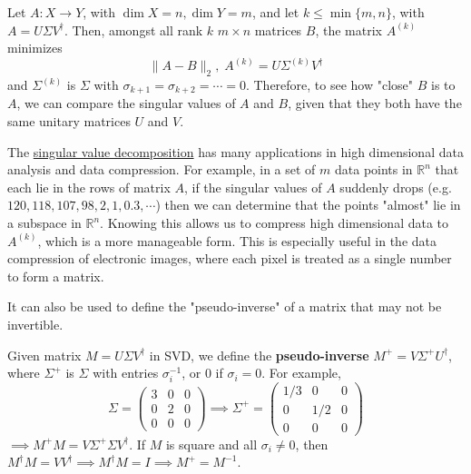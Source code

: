  \begin{theorem}
    \label{thm:eckart-young-low-rank-approximation}
    Let $A: X \to Y$, with $\dim{X} = n, \dim{Y} = m$, and let $k \leq \min{\{m, n\}}$, with $A = U \Sigma V^\dagger$. Then, amongst all rank $k$ $m \times n$ matrices $B$, the matrix $A^{(k)}$ minimizes 
    \begin{equation}
      \|A-B\|_2, \; A^{(k)} = U \Sigma^{(k)} V^\dagger
    \end{equation}
    and $\Sigma^{(k)}$ is $\Sigma$ with $\sigma_{k+1} = \sigma_{k+2} = \cdots = 0$. Therefore, to see how "close" $B$ is to $A$, we can compare the singular values of $A$ and $B$, given that they both have the same unitary matrices $U$ and $V$. 
  \end{theorem}

  The \hyperref[thm:singular-value-decomposition]{singular value decomposition} has many applications in high dimensional data analysis and data compression. For example, in a set of $m$ data points in $\mathbb{R}^n$ that each lie in the rows of matrix $A$, if the singular values of $A$ suddenly drops (e.g. $120, 118, 107, 98, 2, 1, 0.3, \cdots$) then we can determine that the points "almost" lie in a subspace in $\mathbb{R}^n$. Knowing this allows us to compress high dimensional data to $A^{(k)}$, which is a more manageable form. This is especially useful in the data compression of electronic images, where each pixel is treated as a single number to form a matrix. 

  It can also be used to define the "pseudo-inverse" of a matrix that may not be invertible. 

  \begin{definition}
    \label{def:pseudo-inverse}
    Given matrix $M = U \Sigma V^\dagger$ in SVD, we define the \textbf{pseudo-inverse} $M^+ = V \Sigma^+ U^\dagger$, where $\Sigma^+$ is $\Sigma$ with entries $\sigma_i^{-1}$, or $0$ if $\sigma_i = 0$. For example,
    \begin{equation}
      \Sigma = \begin{pmatrix}3&0&0\\0&2&0\\0&0&0\end{pmatrix} \implies \Sigma^+ = \begin{pmatrix}1/3&0&0\\0&1/2&0\\0&0&0\end{pmatrix}
    \end{equation}
    $\implies M^+ M = V \Sigma^+ \Sigma V^\dagger$. If $M$ is square and all $\sigma_i \neq 0$, then $M^\dagger M = V V^\dagger \implies M^\dagger M = I \implies  M^+ = M^{-1}$. 
  \end{definition}

